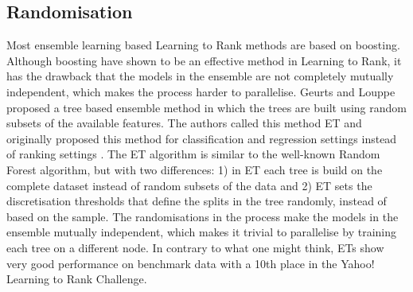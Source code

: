 \subsection{Randomisation}
Most ensemble learning based Learning to Rank methods are based on boosting. Although boosting have shown to be an effective method in Learning to Rank, it has the drawback that the models in the ensemble are not completely mutually independent, which makes the process harder to parallelise. Geurts and Louppe \cite{Geurts2011} proposed a tree based ensemble method in which the trees are built using random subsets of the available features. The authors called this method \ac{ET} and originally proposed this method for classification and regression settings instead of ranking settings \cite{Geurts2006}. The \ac{ET} algorithm is similar to the well-known Random Forest algorithm, but with two differences: 1) in \ac{ET} each tree is build on the complete dataset instead of random subsets of the data and 2) \ac{ET} sets the discretisation thresholds that define the splits in the tree randomly, instead of based on the sample. The randomisations in the process make the models in the ensemble mutually independent, which makes it trivial to parallelise by training each tree on a different node. In contrary to what one might think, \ac{ET}s show very good performance on benchmark data with a 10th place in the Yahoo! Learning to Rank Challenge.\\